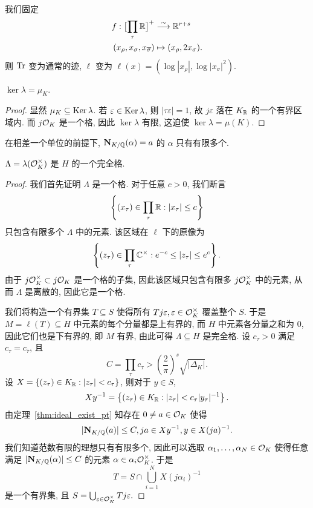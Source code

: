 我们固定
  \[\begin{split}
f:\bigl[\prod_\tau {\mathbb{R}}\bigr]^+&\stackrel{\sim}{\longrightarrow} {\mathbb{R}}^{r+s}\\
(x_\rho,x_\sigma,x_{\overline \sigma})&\mapsto (x_\rho,2x_\sigma).
\end{split}\]
则 ${\mathrm{Tr}}$ 变为通常的迹, $\ell$ 变为 $\ell(x)=(\log|x_\rho|,\log|x_\sigma|^2).$

\begin{proposition}{}{}
$\ker\lambda=\mu_K$.
\end{proposition}
\begin{proof}
显然 $\mu_K\subseteq {\mathrm{Ker}\,}\lambda$. 若 $\varepsilon\in{\mathrm{Ker}\,}\lambda$, 则 $|\tau \varepsilon|=1$, 故 $j\varepsilon$ 落在 $K_{\mathbb{R}}$ 的一个有界区域内. 而 $j{\mathcal{O}}_K$ 是一个格, 因此 $\ker\lambda$ 有限, 这迫使 $\ker\lambda=\mu(K)$.
\end{proof}

\begin{exercise}
在相差一个单位的前提下, ${\mathbf{N}}_{K/{\mathbb{Q}}}(\alpha)=a$ 的 $\alpha$ 只有有限多个.
\end{exercise}

\begin{theorem}{}{}
$\Lambda=\lambda({\mathcal{O}}_K^\times)$ 是 $H$ 的一个完全格.
\end{theorem}
\begin{proof}
我们首先证明 $\Lambda$ 是一个格. 对于任意 $c>0$, 我们断言 
  \[\left\{(x_\tau)\in\prod_\tau {\mathbb{R}}: |x_\tau|\le c\right\}\]
只包含有限多个 $\Lambda$ 中的元素. 该区域在 $\ell$ 下的原像为
  \[\left\{(z_\tau)\in\prod_\tau{\mathbb{C}}^\times: e^{-c}\le |z_\tau|\le e^c\right\}.\]
由于 $j{\mathcal{O}}_K^\times\subset j{\mathcal{O}}_K$ 是一个格的子集, 因此该区域只包含有限多 $j{\mathcal{O}}_K^\times$ 中的元素, 从而 $\Lambda$ 是离散的, 因此它是一个格.

我们将构造一个有界集 $T\subseteq S$ 使得所有 $Tj\varepsilon,\varepsilon\in {\mathcal{O}}_K^\times$ 覆盖整个 $S$. 于是 $M=\ell(T)\subseteq H$ 中元素的每个分量都是上有界的, 而 $H$ 中元素各分量之和为 $0$, 因此它们也是下有界的, 即 $M$ 有界, 由此可得 $\Lambda\subseteq H$ 是完全格. 设 $c_\tau>0$ 满足 $c_\tau=c_{\bar\tau}$, 且
  \[C=\prod_\tau c_\tau>\left(\frac{2}{\pi}\right)^s\sqrt{|\Delta_K|}.\]
设 $X=\left\{(z_\tau)\in K_{\mathbb{R}}: |z_\tau|<c_\tau\right\}$, 则对于 $y\in S$,
  \[Xy^{-1}=\left\{(z_\tau)\in K_{\mathbb{R}}: |z_\tau|<c_\tau|y_\tau|^{-1}\right\}.\]
由定理~\ref{thm:ideal_exist_pt} 知存在 $0\neq a\in{\mathcal{O}}_K$ 使得 
  \[|{\mathbf{N}}_{K/{\mathbb{Q}}}(a)|\le C, ja\in Xy^{-1}, y\in X(ja)^{-1}.\]
我们知道范数有限的理想只有有限多个, 因此可以选取 $\alpha_1,\dots,\alpha_N\in{\mathcal{O}}_K$ 使得任意满足 $|{\mathbf{N}}_{K/{\mathbb{Q}}}(\alpha)|\le C$ 的元素 $\alpha\in \alpha_i {\mathcal{O}}_K^\times$. 于是
  \[T=S\cap \bigcup_{i=1}^N X(j \alpha_i)^{-1}\]
是一个有界集, 且 $S=\bigcup_{\varepsilon\in{\mathcal{O}}_K^\times} Tj\varepsilon.$
\end{proof}

